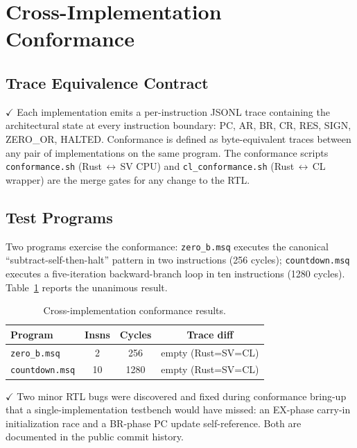 \documentclass[conference,letterpaper,10pt]{IEEEtran}
\newcommand{\Verified}{\textbf{\textcolor[rgb]{0.0,0.5,0.0}{$\checkmark$}}}
\newcommand{\code}[1]{\texttt{\small #1}}
\begin{document}
\section{Cross-Implementation Conformance}

\subsection{Trace Equivalence Contract}

\Verified{} Each implementation emits a per-instruction JSONL
trace containing the architectural state at every instruction
boundary: PC, AR, BR, CR, RES, SIGN, ZERO\_OR, HALTED. Conformance
is defined as byte-equivalent traces between any pair of
implementations on the same program. The conformance scripts
\code{conformance.sh} (Rust\,$\leftrightarrow$\,SV CPU) and
\code{cl\_conformance.sh} (Rust\,$\leftrightarrow$\,CL wrapper)
are the merge gates for any change to the RTL.

\subsection{Test Programs}

Two programs exercise the conformance:
\code{zero\_b.msq} executes the canonical
``subtract-self-then-halt'' pattern in two instructions (256
cycles); \code{countdown.msq} executes a five-iteration
backward-branch loop in ten instructions (1280 cycles).
Table~\ref{tab:conformance} reports the unanimous result.

\begin{table}[t]
\centering
\caption{Cross-implementation conformance results.}
\label{tab:conformance}
\renewcommand{\arraystretch}{1.25}
\begin{tabular}{lccc}
\toprule
\textbf{Program} & \textbf{Insns} & \textbf{Cycles} & \textbf{Trace diff} \\
\midrule
\code{zero\_b.msq}    & 2  & 256  & empty (Rust=SV=CL) \\
\code{countdown.msq}  & 10 & 1280 & empty (Rust=SV=CL) \\
\bottomrule
\end{tabular}
\end{table}

\Verified{} Two minor RTL bugs were discovered and fixed during
conformance bring-up that a single-implementation testbench would
have missed: an EX-phase carry-in initialization race and a
BR-phase PC update self-reference. Both are documented in the
public commit history.
\end{document}
